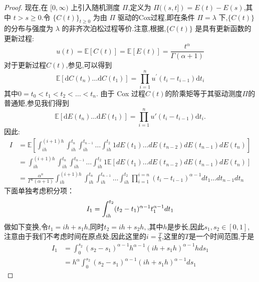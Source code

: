 \begin{proof}    
	现在,在 $[0, \infty)$ 上引入随机测度 $\Pi$,定义为 $\Pi((s, t]) = E(t) - E(s)$,其中 $t > s \geq 0$.令 $\{C(t)\}_{t \geq 0}$ 为由 $\Pi$ 驱动的Cox过程,即在条件 $\Pi = \lambda$ 下,$\{C(t)\}$ 的分布与强度为 $\lambda$ 的非齐次泊松过程等价.注意,根据\cite{kingman1964doubly},$\{C(t)\}$ 是具有更新函数的更新过程:
	\begin{equation}
		u(t) = \mathbb{E}[C(t)] = \mathbb{E}[E(t)] = \frac{t^\alpha}{\Gamma(\alpha+1)}
	\end{equation}
	对于更新过程$C(t)$,参见\cite{daley2003introduction},可以得到
	\begin{equation*}
		\mathbb{E}[\mathrm{d}C(t_n)\ldots\mathrm{d}C(t_1)] = \prod_{i=1}^n u^{\prime}(t_i - t_{i-1})\mathrm{d}t_i
	\end{equation*}
	其中$0 = t_0 < t_1 < t_2 < \ldots <t_n$. 由于 Cox 过程$C(t)$的阶乘矩等于其驱动测度$\Pi$的普通矩,参见\cite{daley2003introduction}我们得到
	\begin{equation*}
		\mathbb{E}[\mathrm dE(t_n)\ldots\mathrm dE(t_1)]=\prod_{i=1}^nu'(t_i-t_{i-1})\mathrm dt_i.
	\end{equation*}
	因此:
	\begin{align*}
		I &= \mathbb{E}\left[\int_{ih}^{(i+1)h}
		\int_{ih}^{t_n}\int_{ih}^{t_{n-1}} \ldots \int_{ih}^{t_{2}} 1 dE(t_1) \ldots dE(t_{n-2})dE(t_{n-1})dE(t_n)\right] \\
		& = \int_{ih}^{(i+1)h}\int_{ih}^{t_n}\int_{ih}^{t_{n-1}}
		\ldots \int_{ih}^{t_{2}} 1 \mathbb{E}\left[dE(t_1) \ldots dE(t_{n-2})dE(t_{n-1})dE(t_n)\right] \\
		& = \frac{\alpha^n}{\Gamma^n(\alpha+1)}
		\int_{ih}^{(i+1)h}\int_{ih}^{t_n}\int_{ih}^{t_{n-1}} \ldots \int_{ih}^{t_{2}} \prod_{i=1}^{i=n}(t_i-t_{i-1})^{\alpha -1} dt_1 \ldots dt_{n-1}dt_n
	\end{align*}
	下面单独考虑积分项：
	\begin{equation*}
		I_{1}=\int_{ih}^{t_{2}} (t_{2}-t_1)^{\alpha -1} t_1^{\alpha - 1} dt_1 \\
	\end{equation*}
	做如下变换,令$t_{1} = ih + s_{1}h$,同时$t_2 = ih + s_2h ,$,其中$h$是步长,因此$s_1,s_{2} \in [0,1]$,注意由于我们不考虑时间在原点处,因此这里的$i=\frac{T}{h}$,这里的$T$是一个时间范围,于是
	\begin{align*}
		I_1 &= \int_{0}^{s_{2}} (s_{2}-s_{1})^{\alpha -1}h^{\alpha -1} (ih + s_1h)^{\alpha - 1}h ds_1 \\
		&= h^{\alpha}\int_{0}^{s_{2}} (s_{2}-s_{1})^{\alpha -1} (ih + s_1h)^{\alpha - 1} ds_1

\end{align*}
\end{proof}
